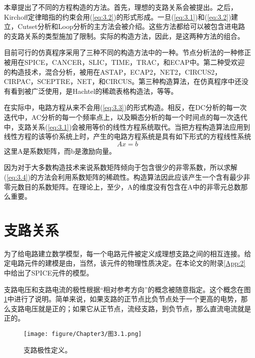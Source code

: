 本章提出了不同的方程构造的方法。首先，理想的支路关系会被提出。之后，Kirchoff定律暗指的约束会用(\ref{eq:3.2})的形式形成。一旦(\ref{eq:3.1})和(\ref{eq:3.2})建立，Cutset分析和Loop分析的主方法会被介绍。这些方法都给可以被包含进电路的支路关系的类型施加了限制。实际的构造方法，因此，是这两种方法的组合。

目前可行的仿真程序采用了三种不同的构造方法中的一种。节点分析法的一种修正被用在SPICE，CANCER\cite{ref-2,ref-3}，SLIC\cite{ref-14,ref-15}，TIME\cite{ref-19}，TRAC\cite{ref-39}，和ECAP\cite{ref-40}中。第二种受欢迎的构造技术，混合分析，被用在ASTAP\cite{ref-28,ref-29}，ECAP2\cite{ref-31,ref-32}，NET2\cite{ref-33}，CIRCUS2\cite{ref-34}，CIRPAC\cite{ref-41,ref-42}，SCEPTRE\cite{ref-43}，NET\cite{ref-44}，和CIRCUS\cite{ref-45}。第三种构造算法，在仿真程序中还没有看到被广泛使用，是Hachtel的稀疏表格构造法，等等\cite{ref-46}。

在实际中，电路方程从来不会用(\ref{eq:3.3})的形式构造。相反，在DC分析的每一次迭代中，AC分析的每一个频率点上，以及瞬态分析的每一个时间点的每一次迭代中，支路关系(\ref{eq:3.1})会被用等价的线性方程系统取代。当把方程构造算法应用到线性方程的该等价系统上时，产生的电路方程系统是具有如下形式的方程线性系统
\begin{equation}
    A x = b
    \label{eq:3.4}
\end{equation}
这里A是系数矩阵，而b是激励向量。

因为对于大多数构造技术来说系数矩阵倾向于包含很少的非零系数，所以求解(\ref{eq:3.4})的方法会利用系数矩阵的稀疏性。构造算法因此应该产生一个含有最少非零元数目的系数矩阵。在理论上，至少，A的维度没有包含在A中的非零元总数那么重要。

\section{支路关系}
为了给电路建立数学模型，每一个电路元件被定义成理想支路之间的相互连接。给定电路元件的建模是由，当然，该元件的物理性质决定。在本论文的附录\ref{App:2}中给出了SPICE元件的模型。

支路电压和支路电流的极性根据“相对参考方向”的概念\cite{ref-7}被随意指定。这个概念在图\ref{图3.1}中进行了说明。简单来说，如果支路的正节点比负节点处于一个更高的电势，那么支路电压就是正的；如果它从正节点，流经支路，到负节点，那么直流电流就是正的。

\begin{figure}[htbp]
\small
    \centering
    \texttt{[image: figure/Chapter3/图3.1.png]}
    \caption{支路极性定义。}
    \label{图3.1}
\end{figure}

